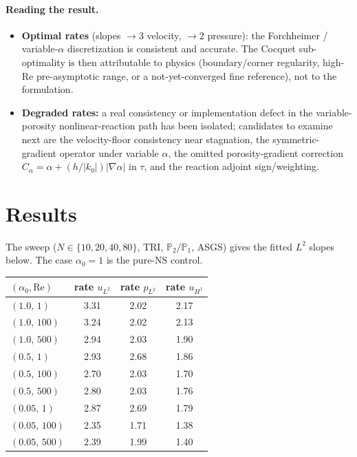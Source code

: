 \documentclass[11pt]{article}
\newcommand{\grad}{\nabla}
\begin{document}
\paragraph{Reading the result.}
\begin{itemize}
\item \textbf{Optimal rates} (slopes $\to 3$ velocity, $\to 2$ pressure):
      the Forchheimer / variable-$\alpha$ discretization is consistent and
      accurate. The Cocquet sub-optimality is then attributable to physics
      (boundary/corner regularity, high-$\mathrm{Re}$ pre-asymptotic range, or
      a not-yet-converged fine reference), not to the formulation.
\item \textbf{Degraded rates:} a real consistency or implementation defect in
      the variable-porosity nonlinear-reaction path has been isolated;
      candidates to examine next are the velocity-floor consistency near
      stagnation, the symmetric-gradient operator under variable $\alpha$, the
      omitted porosity-gradient correction $C_\alpha=\alpha+(h/|k_0|)|\grad\alpha|$
      in $\tau$, and the reaction adjoint sign/weighting.
\end{itemize}

\section{Results}
\label{sec:results}

The sweep ($N\in\{10,20,40,80\}$, TRI, $\mathbb P_2/\mathbb P_1$, ASGS) gives
the fitted $L^2$ slopes below. The case $\alpha_0=1$ is the pure-NS control.

\begin{center}
\begin{tabular}{lccc}
\toprule
$(\alpha_0,\mathrm{Re})$ & rate $u_{L^2}$ & rate $p_{L^2}$ & rate $u_{H^1}$\\
\midrule
$(1.0,\,1)$    & 3.31 & 2.02 & 2.17\\
$(1.0,\,100)$  & 3.24 & 2.02 & 2.13\\
$(1.0,\,500)$  & 2.94 & 2.03 & 1.90\\
$(0.5,\,1)$    & 2.93 & 2.68 & 1.86\\
$(0.5,\,100)$  & 2.70 & 2.03 & 1.70\\
$(0.5,\,500)$  & 2.80 & 2.03 & 1.76\\
$(0.05,\,1)$   & 2.87 & 2.69 & 1.79\\
$(0.05,\,100)$ & 2.35 & 1.71 & 1.38\\
$(0.05,\,500)$ & 2.39 & 1.99 & 1.40\\
\bottomrule
\end{tabular}
\end{center}
\end{document}
